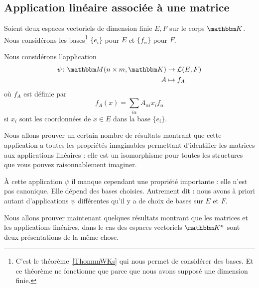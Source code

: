 \subsection{Application linéaire associée à une matrice}

Soient deux espaces vectoriels de dimension finie \( E,F\) sur le corps \( \eK\). Nous considérons les bases\footnote{C'est le théorème~\ref{ThonmnWKs} qui nous permet de considérer des bases. Et ce théorème ne fonctionne que parce que nous avons supposé une dimension finie.} \( \{ e_i \}\) pour \( E\) et \( \{ f_{\alpha} \}\) pour \( F\). 

\begin{definition}      \label{DEFooJVOAooUgGKme}
    Nous considérons l'application
    \begin{equation}        \label{EQooVZQWooMyFFeO}
        \begin{aligned}
            \psi\colon \eM(n\times m, \eK)&\to \aL(E,F) \\
            A&\mapsto f_A 
        \end{aligned}
    \end{equation}
    où \( f_A\) est définie par
    \begin{equation}        \label{EQooBVGHooJhFbMs}
        f_A(x)=\sum_{i\alpha}A_{\alpha i}x_if_{\alpha}
    \end{equation}
    si \( x_i\) sont les coordonnées de \( x\in E\) dans la base \( \{ e_i \}\).
\end{definition}



\begin{normaltext}
    Nous allons prouver un certain nombre de résultats montrant que cette application a toutes les propriétés imaginables permettant d'identifier les matrices aux applications linéaires : elle est un isomorphisme pour toutes les structures que vous pouvez raisonnablement imaginer.

    À cette application \( \psi\) il manque cependant une propriété importante : elle n'est pas canonique. Elle dépend des bases choisies. Autrement dit : nous avons à priori autant d'applications \( \psi\) différentes qu'il y a de choix de bases sur \( E\) et \( F\). %

    Nous allons prouver maintenant quelques résultats montrant que les matrices et les applications linéaires, dans le cas des espaces vectoriels \( \eK^n\) sont deux présentations de la même chose.
\end{normaltext}

